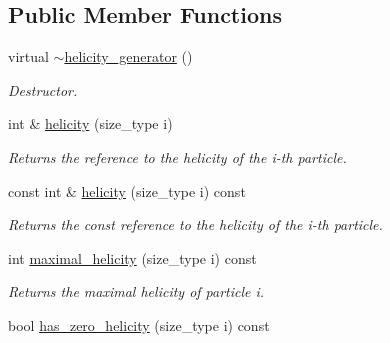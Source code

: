\subsection*{Public Member Functions}
\begin{DoxyCompactItemize}
\item 
\hypertarget{a00267_a225344dbb12c3e0ab9d20d94a7890809}{virtual \hyperlink{a00267_a225344dbb12c3e0ab9d20d94a7890809}{$\sim$helicity\-\_\-generator} ()}\label{a00267_a225344dbb12c3e0ab9d20d94a7890809}

\begin{DoxyCompactList}\small\item\em Destructor. \end{DoxyCompactList}\item 
\hypertarget{a00267_af547f9bf6b087eb596ee75c730fc84d2}{int \& \hyperlink{a00267_af547f9bf6b087eb596ee75c730fc84d2}{helicity} (size\-\_\-type i)}\label{a00267_af547f9bf6b087eb596ee75c730fc84d2}

\begin{DoxyCompactList}\small\item\em Returns the reference to the helicity of the i-\/th particle. \end{DoxyCompactList}\item 
\hypertarget{a00267_a9bbbbc353160c3c324dad288dc92ad67}{const int \& \hyperlink{a00267_a9bbbbc353160c3c324dad288dc92ad67}{helicity} (size\-\_\-type i) const }\label{a00267_a9bbbbc353160c3c324dad288dc92ad67}

\begin{DoxyCompactList}\small\item\em Returns the const reference to the helicity of the i-\/th particle. \end{DoxyCompactList}\item 
\hypertarget{a00267_a4d9caa3945423bff1cedb9e3f120ae0f}{int \hyperlink{a00267_a4d9caa3945423bff1cedb9e3f120ae0f}{maximal\-\_\-helicity} (size\-\_\-type i) const }\label{a00267_a4d9caa3945423bff1cedb9e3f120ae0f}

\begin{DoxyCompactList}\small\item\em Returns the maximal helicity of particle i. \end{DoxyCompactList}\item 
\hypertarget{a00267_a553cc4fe3cdd3161718190684845edc7}{bool \hyperlink{a00267_a553cc4fe3cdd3161718190684845edc7}{has\-\_\-zero\-\_\-helicity} (size\-\_\-type i) const }\label{a00267_a553cc4fe3cdd3161718190684845edc7}


\end{DoxyCompactItemize}
